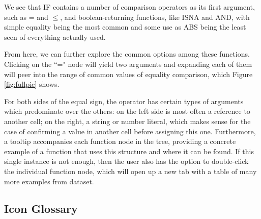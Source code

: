 \documentclass[conference]{IEEEtran}
\begin{document}
	We see that IF contains a number of comparison operators as its first argument,
	such as = and $\le$, and boolean-returning functions, like ISNA and AND, with
	simple equality being the most common and some use as ABS being the least seen
	of everything actually used. \par
	
	From here, we can further explore the common options among these functions.
	Clicking on the ``=" node will yield two arguments and expanding each of them
	will peer into the range of common values of equality comparison, which Figure
	\ref{fig:fullpic} shows. \par
	
	For both sides of the equal sign, the operator has certain types of arguments
	which predominate over the others: on the left side is most often a reference
	to another cell; on the right, a string or number literal, which makes sense
	for the case of confirming a value in another cell before assigning this one.
	Furthermore, a tooltip accompanies each function node in the tree, providing a
	concrete example of a function that uses this structure and where it can be
	found. If this single instance is not enough, then the user also has the option
	to double-click the individual function node, which will open up a new tab with
	a table of many more examples from dataset.
	
	\subsection{Icon Glossary}
	
\end{document}
